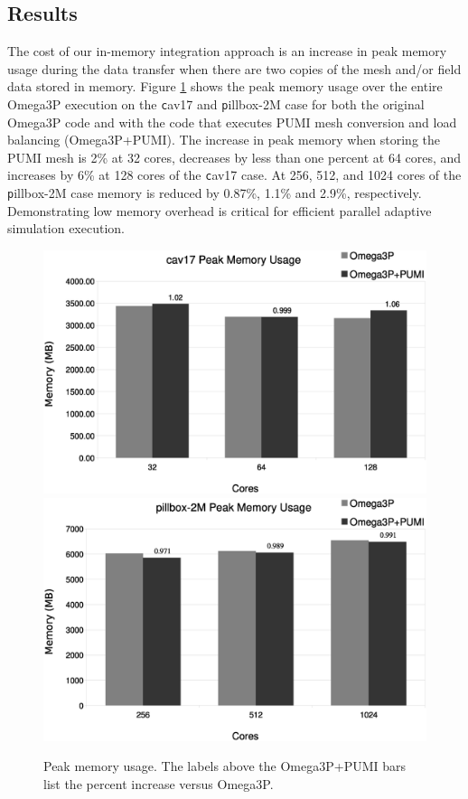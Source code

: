 \documentclass[review,12pt]{elsarticle_summary_report}
\begin{document}
\subsection{\label{in_memory_results} Results}
The cost of our in-memory integration approach is an increase in peak memory
usage during the data transfer when there are two copies of the mesh and/or
field data stored in memory.
Figure \ref{fig:memusage} shows the peak memory usage over the entire Omega3P
execution on the {\texttt cav17} and {\texttt pillbox-2M} case for both the
original Omega3P code and with the code that executes PUMI mesh conversion and
load balancing (Omega3P+PUMI).
The increase in peak memory when storing the PUMI mesh is 2\% at 32 cores,
decreases by less than one percent at 64 cores, and increases by 6\% at 128
cores of the {\texttt cav17} case.
At 256, 512, and 1024 cores of the {\texttt pillbox-2M} case memory is reduced by
0.87\%, 1.1\% and 2.9\%, respectively.
Demonstrating low memory overhead is critical for efficient parallel adaptive
simulation execution.

\begin{figure}[!ph]
\centering
  \includegraphics[width=.75\textwidth]{cav17-peak-mem.eps}
  \includegraphics[width=.75\textwidth]{pillbox2M-peak-mem.eps}
  \caption{\label{fig:memusage} Peak memory usage. The labels above the Omega3P+PUMI bars
  list the percent increase versus Omega3P.}
\end{figure}
\end{document}
